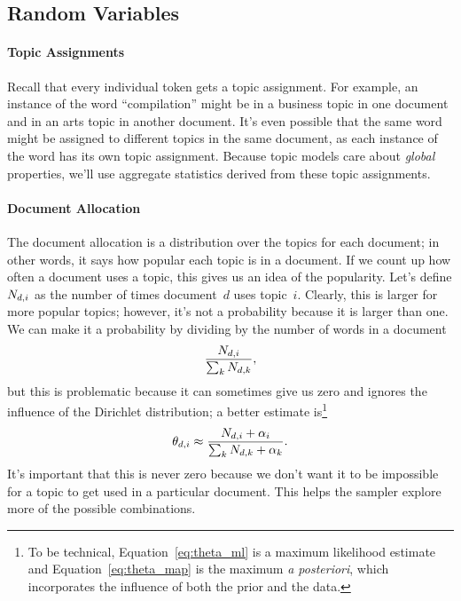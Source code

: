 \subsection{Random Variables}

\paragraph{Topic Assignments}

Recall that every individual token gets a topic assignment.  For example,
an instance of the word ``compilation'' might be in a business topic in one
document and in an arts topic in another document.  It's even possible that the
same word might be assigned to different topics in the same document, as each
instance of the word has its own topic assignment.  Because topic models care
about \emph{global} properties, we'll use aggregate statistics derived from
these topic assignments.

\paragraph{Document Allocation} The document allocation is a distribution over
the topics for each document; in other words, it says how popular each topic is
in a document.  If we count up how often a document uses a topic, this gives us
an idea of the popularity.  Let's define $N_{d,i}$ as the number of times
document~$d$ uses topic~$i$.  Clearly, this is larger for more popular topics;
however, it's not a probability because it is larger than one.  We can make it a
probability by dividing by the number of words in a document
\begin{equation}
\frac{N_{d,i}}{\sum_k N_{d,k}},
\label{eq:theta_ml}
\end{equation}
but this is problematic because it can sometimes give us zero and ignores the
influence of the Dirichlet distribution; a better estimate is\footnote{To be
  technical, Equation~\ref{eq:theta_ml} is a maximum likelihood estimate and
  Equation~\ref{eq:theta_map} is the maximum \textit{a posteriori}, which
  incorporates the influence of both the prior and the data.}
\begin{equation}
\theta_{d,i} \approx \frac{N_{d,i} + \alpha_i}{\sum_k N_{d,k} + \alpha_k}.
\label{eq:theta_map}
\end{equation}
It's important that this is never zero because we don't want it to be impossible
for a topic to get used in a particular document.  This helps the sampler
explore more of the possible combinations.

